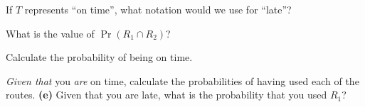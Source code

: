 \item  If $T$ represents ``on time'', what notation would we use for ``late''? 
 \item  What is the value of $\Pr(R_1 \cap R_2)$? 
 \item  Calculate the probability of being on time. 
 \item  \emph{Given that} you \emph{are} on time, calculate the probabilities of having used each of the routes. 
 {\bf(e)} Given that you are late, what is the probability that you used $R_1$?




